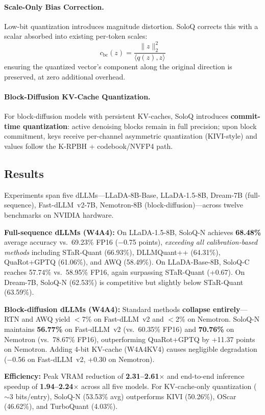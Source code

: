 \documentclass[11pt,a4paper]{article}
\begin{document}
\paragraph{Scale-Only Bias Correction.}
Low-bit quantization introduces magnitude distortion. SoloQ corrects this with a scalar absorbed into existing per-token scales:
\begin{equation}
c_{\text{bc}}(z) = \frac{\|z\|_2^2}{\langle q(z), z \rangle}
\end{equation}
ensuring the quantized vector's component along the original direction is preserved, at zero additional overhead.

\paragraph{Block-Diffusion KV-Cache Quantization.}
For block-diffusion models with persistent KV-caches, SoloQ introduces \textbf{commit-time quantization}: active denoising blocks remain in full precision; upon block commitment, keys receive per-channel asymmetric quantization (KIVI-style) and values follow the K-RPBH + codebook/NVFP4 path.

\subsection{Results}
Experiments span five dLLMs---LLaDA-8B-Base, LLaDA-1.5-8B, Dream-7B (full-sequence), Fast-dLLM~v2-7B, Nemotron-8B (block-diffusion)---across twelve benchmarks on NVIDIA hardware.

\textbf{Full-sequence dLLMs (W4A4):} On LLaDA-1.5-8B, SoloQ-N achieves \textbf{68.48\%} average accuracy vs.\ 69.23\% FP16 ($-$0.75 points), \emph{exceeding all calibration-based methods} including STaR-Quant (66.93\%), DLLMQuant++ (64.31\%), QuaRot+GPTQ (61.06\%), and AWQ (58.49\%). On LLaDA-Base-8B, SoloQ-C reaches 57.74\% vs.\ 58.95\% FP16, again surpassing STaR-Quant (+0.67). On Dream-7B, SoloQ-N (62.53\%) is competitive but slightly below STaR-Quant (63.59\%).

\textbf{Block-diffusion dLLMs (W4A4):} Standard methods \textbf{collapse entirely}---RTN and AWQ yield $<$7\% on Fast-dLLM~v2 and $<$2\% on Nemotron. SoloQ-N maintains \textbf{56.77\%} on Fast-dLLM~v2 (vs.\ 60.35\% FP16) and \textbf{70.76\%} on Nemotron (vs.\ 78.67\% FP16), outperforming QuaRot+GPTQ by +11.37 points on Nemotron. Adding 4-bit KV-cache (W4A4KV4) causes negligible degradation ($-$0.56 on Fast-dLLM~v2, +0.30 on Nemotron).

\textbf{Efficiency:} Peak VRAM reduction of \textbf{2.31--2.61$\times$} and end-to-end inference speedup of \textbf{1.94--2.24$\times$} across all five models. For KV-cache-only quantization ($\sim$3 bits/entry), SoloQ-N (53.53\% avg) outperforms KIVI (50.26\%), OScar (46.62\%), and TurboQuant (4.03\%).
\end{document}
